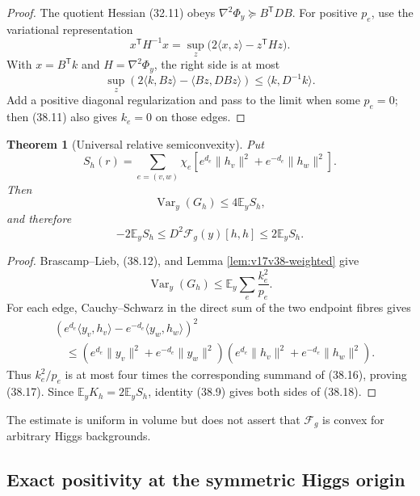 \documentclass[11pt]{article}
\newtheorem{theorem}{Theorem}[section]
\theoremstyle{remark}
\begin{document}
\begin{proof}
The quotient Hessian (32.11) obeys
\(\nabla^2\Phi_y\succeq B^{\mathsf T}DB\).  For positive
\(p_e\), use the variational representation
\[
 x^{\mathsf T}H^{-1}x
 =\sup_z\bigl(2\langle x,z\rangle-z^{\mathsf T}Hz\bigr).       \tag{38.14}
\]
With \(x=B^{\mathsf T}k\) and
\(H=\nabla^2\Phi_y\), the right side is at most
\[
 \sup_z\left(
 2\langle k,Bz\rangle-\langle Bz,D Bz\rangle
 \right)
 \leq\langle k,D^{-1}k\rangle.                   \tag{38.15}
\]
Add a positive diagonal regularization and pass to the limit when some
\(p_e=0\); then (38.11) also gives \(k_e=0\) on those edges.
\end{proof}

\begin{theorem}[Universal relative semiconvexity]
\label{thm:v17v38-semiconvex}
Put
\[
 S_h(r)=\sum_{e=(v,w)}\chi_e\left[
 e^{d_e}\|h_v\|^2+e^{-d_e}\|h_w\|^2
 \right].                                         \tag{38.16}
\]
Then
\[
 \operatorname{Var}_y(G_h)
 \leq4\mathbb E_yS_h,                              \tag{38.17}
\]
and therefore
\[
 \boxed{
 -2\mathbb E_yS_h
 \leq D^2\mathcal F_g(y)[h,h]
 \leq2\mathbb E_yS_h.}                            \tag{38.18}
\]
\end{theorem}

\begin{proof}
Brascamp--Lieb, (38.12), and Lemma
\ref{lem:v17v38-weighted} give
\[
 \operatorname{Var}_y(G_h)
 \leq\mathbb E_y\sum_e\frac{k_e^2}{p_e}.          \tag{38.19}
\]
For each edge, Cauchy--Schwarz in the direct sum of the two endpoint
fibres gives
\[
\begin{aligned}
 &\left(
 e^{d_e}\langle y_v,h_v\rangle
 -e^{-d_e}\langle y_w,h_w\rangle
 \right)^2\\
 &\quad\leq
 \left(e^{d_e}\|y_v\|^2+e^{-d_e}\|y_w\|^2\right)
 \left(e^{d_e}\|h_v\|^2+e^{-d_e}\|h_w\|^2\right).            \tag{38.20}
\end{aligned}
\]
Thus \(k_e^2/p_e\) is at most four times the corresponding summand of
(38.16), proving (38.17).  Since
\(\mathbb E_yK_h=2\mathbb E_yS_h\), identity (38.9) gives both sides of
(38.18).
\end{proof}

The estimate is uniform in volume but does not assert that
\(\mathcal F_g\) is convex for arbitrary Higgs backgrounds.

\subsection{Exact positivity at the symmetric Higgs origin}
\end{document}
